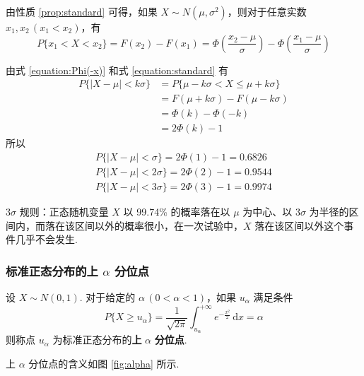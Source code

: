 由性质 \ref*{prop:standard} 可得，如果 $X \sim N(\mu,\sigma^2)$，则对于任意实数 $x_1,x_2\,(x_1 < x_2)$，有
\begin{equation}
    P\{x_1 < X < x_2\} = F(x_2)-F(x_1) = \varPhi(\dfrac{x_2-\mu}{\sigma}) - \varPhi(\dfrac{x_1-\mu}{\sigma})
\end{equation}

由式 \eqref{equation:Phi(-x)} 和式 \eqref{equation:standard} 有
$$
\begin{aligned}
    P\{|X-\mu| < k \sigma\} &= P\{\mu - k \sigma < X \leqslant \mu + k \sigma\} \\
    &= F(\mu+k\sigma) - F(\mu-k\sigma) \\
    &= \varPhi(k)-\varPhi(-k) \\
    &= 2\varPhi(k)-1
\end{aligned}
$$
所以
\begin{gather*}
    P\{|X-\mu|<\sigma\}=2\varPhi(1)-1=0.6826\\
    P\{|X-\mu|<2\sigma\}=2\varPhi(2)-1=0.9544\\
    P\{|X-\mu|<3\sigma\}=2\varPhi(3)-1=0.9974
\end{gather*}

$3\sigma$ 规则：正态随机变量 $X$ 以 99.74\% 的概率落在以 $\mu$ 为中心、以 $3\sigma$ 为半径的区间内，而落在该区间以外的概率很小，在一次试验中，$X$ 落在该区间以外这个事件几乎不会发生.

\subsubsection{标准正态分布的上 $\alpha$ 分位点}

\begin{definition}
    设 $X \sim N(0,1)$. 对于给定的 $\alpha \, (0 < \alpha < 1)$，如果 $u_{\alpha}$ 满足条件
    $$
    P\{X \geqslant u_{\alpha}\} = \dfrac{1}{\sqrt{2\pi}} \int_{u_{\alpha}}^{+\infty} e^{-\frac{x^2}{2}} \, \text{d}x = \alpha
    $$
    则称点 $u_{\alpha}$ 为标准正态分布的\textbf{上} $\alpha$ \textbf{分位点}.
\end{definition}

上 $\alpha$ 分位点的含义如图 \ref{fig:alpha} 所示.

